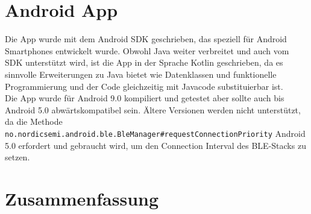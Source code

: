 \section{Android App}
Die App wurde mit dem Android SDK geschrieben, das speziell für Android Smartphones entwickelt wurde.
Obwohl Java weiter verbreitet und auch vom SDK unterstützt wird, ist die App in der Sprache Kotlin geschrieben, da es sinnvolle Erweiterungen zu Java bietet wie Datenklassen und funktionelle Programmierung und der Code gleichzeitig mit Javacode substituierbar ist.\\
Die App wurde für Android 9.0 kompiliert und getestet aber sollte auch bis Android 5.0 abwärtskompatibel sein.
Ältere Versionen werden nicht unterstützt, da die Methode \texttt{no.\allowbreak{}nordicsemi.\allowbreak{}android.\allowbreak{}ble.\allowbreak{}BleManager\#\allowbreak{}requestConnectionPriority} Android 5.0 erfordert und gebraucht wird, um den Connection Interval des BLE-Stacks zu setzen.\\


\section{Zusammenfassung}
